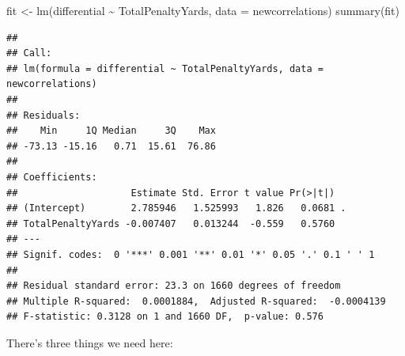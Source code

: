 \documentclass[
]{book}
\newenvironment{Shaded}{\begin{snugshade}}{\end{snugshade}}
\newcommand{\AttributeTok}[1]{\textcolor[rgb]{0.77,0.63,0.00}{#1}}
\newcommand{\FunctionTok}[1]{\textcolor[rgb]{0.00,0.00,0.00}{#1}}
\newcommand{\NormalTok}[1]{#1}
\newcommand{\OtherTok}[1]{\textcolor[rgb]{0.56,0.35,0.01}{#1}}
\newcommand{\SpecialCharTok}[1]{\textcolor[rgb]{0.00,0.00,0.00}{#1}}
\begin{document}
\begin{Shaded}
\begin{Highlighting}[]
\NormalTok{fit }\OtherTok{\textless{}{-}} \FunctionTok{lm}\NormalTok{(differential }\SpecialCharTok{\textasciitilde{}}\NormalTok{ TotalPenaltyYards, }\AttributeTok{data =}\NormalTok{ newcorrelations)}
\FunctionTok{summary}\NormalTok{(fit)}
\end{Highlighting}
\end{Shaded}

\begin{verbatim}
## 
## Call:
## lm(formula = differential ~ TotalPenaltyYards, data = newcorrelations)
## 
## Residuals:
##    Min     1Q Median     3Q    Max 
## -73.13 -15.16   0.71  15.61  76.86 
## 
## Coefficients:
##                    Estimate Std. Error t value Pr(>|t|)  
## (Intercept)        2.785946   1.525993   1.826   0.0681 .
## TotalPenaltyYards -0.007407   0.013244  -0.559   0.5760  
## ---
## Signif. codes:  0 '***' 0.001 '**' 0.01 '*' 0.05 '.' 0.1 ' ' 1
## 
## Residual standard error: 23.3 on 1660 degrees of freedom
## Multiple R-squared:  0.0001884,  Adjusted R-squared:  -0.0004139 
## F-statistic: 0.3128 on 1 and 1660 DF,  p-value: 0.576
\end{verbatim}

There's three things we need here:
\end{document}
